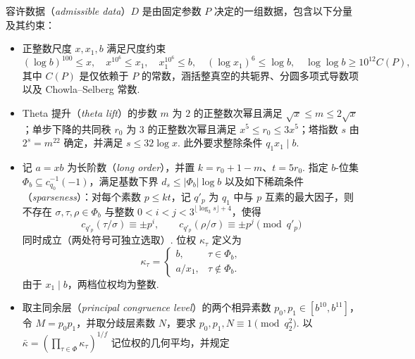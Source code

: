 \begin{definition}[容许数据]
\label{def:admissible-data}
\emitthmsource
容许数据（\emph{admissible data}）$D$ 是由固定参数 $P$ 决定的一组数据，包含以下分量及其约束：
\begin{itemize}
\item 正整数尺度 $x,x_1,b$ 满足尺度约束
\begin{equation}
 (\log b)^{100}\le x,\quad x^{10^6}\le x_1,\quad x_1^{10^6}\le b,\quad
 (\log x_1)^6\le\log b,\quad \log\log b\ge 10^{12}C(P),
\label{eq:admissible-scales}
\end{equation}
其中 $C(P)$ 是仅依赖于 $P$ 的常数，涵括整真空的共轭界、分圆多项式导数项以及 Chowla--Selberg 常数.
\item Theta 提升（\emph{theta lift}）的步数 $m$ 为 $2$ 的正整数次幂且满足 $\sqrt x\le m\le2\sqrt x$；单步下降的共同秩 $r_0$ 为 $3$ 的正整数次幂且满足 $x^5\le r_0\le3x^5$；塔指数 $s$ 由 $2^s=m^{22}$ 确定，并满足 $s\le32\log x$. 此外要求整除条件 $q_1x_1\mid b$.
\item 记 $a=xb$ 为长阶数（\emph{long order}），并置 $k=r_0+1-m$、$t=5r_0$. 指定 $b$-位集 $\Phi_b\subseteq c_{q_0}^{-1}(-1)$，满足基数下界 $d_s\le|\Phi_b|\log b$ 以及如下稀疏条件（\emph{sparseness}）：对每个素数 $p\le kt$，记 $q'_p$ 为 $q_1$ 中与 $p$ 互素的最大因子，则不存在 $\sigma,\tau,\rho\in\Phi_b$ 与整数 $0<i<j<3^{\lfloor\log_3s\rfloor+4}$，使得
\[
 c_{q'_p}(\tau/\sigma)\equiv\pm p^i,\qquad
 c_{q'_p}(\rho/\sigma)\equiv\pm p^j\pmod{q'_p}
\]
同时成立（两处符号可独立选取）. 位权 $\kappa_\tau$ 定义为
\begin{equation}
 \kappa_\tau=
 \begin{cases}
 b, &\tau\in\Phi_b,\\
 a/x_1,&\tau\notin\Phi_b.
 \end{cases}
\label{eq:admissible-place-weights}
\end{equation}
由于 $x_1\mid b$，两档位权均为整数.
\item 取主同余层（\emph{principal congruence level}）的两个相异素数 $p_0,p_1\in[b^{10},b^{11}]$，令 $M=p_0p_1$，并取分歧层素数 $N$，要求 $p_0,p_1,N\equiv1\pmod{q_2^2}$. 以 $\bar\kappa=(\prod_{\tau\in\Phi}\kappa_\tau)^{1/f}$ 记位权的几何平均，并规定

\end{itemize}
\end{definition}
